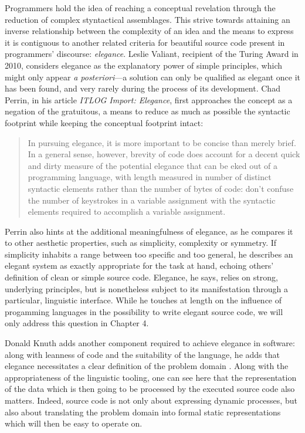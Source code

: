 Programmers hold the idea of reaching a conceptual revelation through the reduction of complex styntactical assemblages. This strive towards attaining an inverse relationship between the complexity of an idea and the means to express it is contiguous to another related criteria for beautiful source code present in programmers' discourse: \emph{elegance}. Leslie Valiant, recipient of the Turing Award in 2010, considers elegance as the explanatory power of simple principles, which might only appear \emph{a posteriori}—a solution can only be qualified as elegant once it has been found, and very rarely during the process of its development\citep{anthes_beauty_2011}. Chad Perrin, in his article \emph{ITLOG Import: Elegance}, first approaches the concept as a negation of the gratuitous, a means to reduce as much as possible the syntactic footprint while keeping the conceptual footprint intact:

\begin{quote}
  In pursuing elegance, it is more important to be concise than merely brief. In a general sense, however, brevity of code does account for a decent quick and dirty measure of the potential elegance that can be eked out of a programming language, with length measured in number of distinct syntactic elements rather than the number of bytes of code: don't confuse the number of keystrokes in a variable assignment with the syntactic elements required to accomplish a variable assignment. \citep{perrin_itlog_2006}
\end{quote}

Perrin also hints at the additional meaningfulness of elegance, as he compares it to other aesthetic properties, such as simplicity, complexity or symmetry. If simplicity inhabits a range between too specific and too general, he describes an elegant system as exactly appropriate for the task at hand, echoing others' definition of clean or simple source code. Elegance, he says, relies on strong, underlying principles, but is nonetheless subject to its manifestation through a particular, linguistic interface. While he touches at length on the influence of progamming languages in the possibility to write elegant source code, we will only address this question in Chapter 4.

Donald Knuth adds another component required to achieve elegance in software: along with leanness of code and the suitability of the language, he adds that elegance necessitates a clear definition of the problem domain \citep{fuller_software_2008}. Along with the appropriateness of the linguistic tooling, one can see here that the representation of the data which is then going to be processed by the executed source code also matters. Indeed, source code is not only about expressing dynamic processes, but also about translating the problem domain into formal static representations which will then be easy to operate on.


